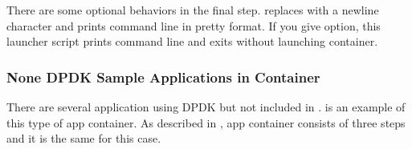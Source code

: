 \documentclass[a4paper,11pt,openany,oneside,english]{sphinxmanual}
\begin{document}
\begin{sphinxVerbatim}[commandchars=\\\{\},formatcom=\footnotesize]
      \PYG{p}{[} \PYG{p}{]}  \PYGZbs{}
        
 \PYG{p}{[}\PYG{p}{]}  

   

   
\end{sphinxVerbatim}

There are some optional behaviors in the final step.
 replaces \sphinxcode{\sphinxupquote{\textbackslash{}\textbackslash{}}} with a newline character
and prints command line in pretty format.
If you give  option, this launcher script prints command line
and exits without launching container.


\subsubsection{None DPDK Sample Applications in Container}
\label{\detokenize{tools/sppc/howto_launcher:none-dpdk-sample-applications-in-container}}\label{\detokenize{tools/sppc/howto_launcher:sppc-howto-none-dpdk-sample-apps}}
There are several application using DPDK but not included in
.
 is an example of this type of app container.
As described in {\hyperref[\detokenize{tools/sppc/howto_launcher:sppc-howto-dpdk-sample-appc}]{}},
app container consists of three steps and it is the same for
this case.
\end{document}
